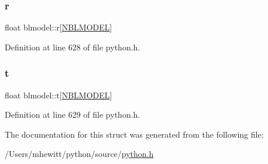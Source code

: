 \subsubsection{\texorpdfstring{r}{r}}
{\footnotesize\ttfamily float blmodel\+::r\mbox{[}\hyperlink{python_8h_ac7030ca4044704dd2a36d30676b75ffe}{N\+B\+L\+M\+O\+D\+EL}\mbox{]}}



Definition at line 628 of file python.\+h.

\mbox{\label{structblmodel_a58ed9c6aa9cdfa7a4d9b2346d5186ac2}} 
\subsubsection{\texorpdfstring{t}{t}}
{\footnotesize\ttfamily float blmodel\+::t\mbox{[}\hyperlink{python_8h_ac7030ca4044704dd2a36d30676b75ffe}{N\+B\+L\+M\+O\+D\+EL}\mbox{]}}



Definition at line 629 of file python.\+h.



The documentation for this struct was generated from the following file\+:\begin{DoxyCompactItemize}
\item 
/\+Users/mhewitt/python/source/\hyperlink{python_8h}{python.\+h}\end{DoxyCompactItemize}
